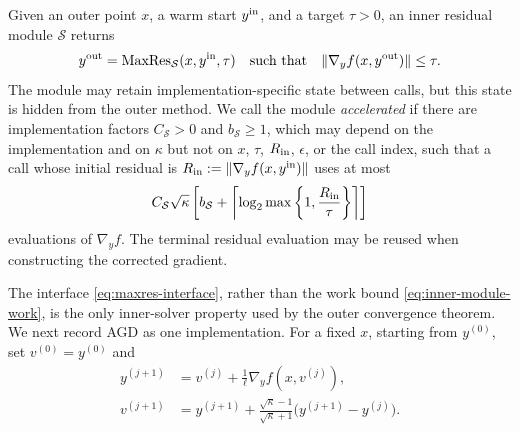 \documentclass{article}
\begin{document}
\begin{definition}
\label{def:inner-residual-module}
Given an outer point $x$, a warm start $y^{\rm in}$, and a target
$\tau>0$, an inner residual module $\mathcal S$ returns
\begin{equation}\label{eq:maxres-interface}
 y^{\rm out}
 =\operatorname{MaxRes}_{\mathcal S}(x,y^{\rm in},\tau)
 \quad\text{such that}\quad
 \|\nabla_yf(x,y^{\rm out})\|\le\tau.
\end{equation}
The module may retain implementation-specific state between calls, but
this state is hidden from the outer method.  We call the module
\emph{accelerated} if there are implementation factors
$C_{\mathcal S}>0$ and $b_{\mathcal S}\ge1$, which may depend on the
implementation and on $\kappa$ but not on $x$, $\tau$, $R_{\rm in}$,
$\epsilon$, or the call index, such that a call whose
initial residual is
$R_{\rm in}:=\|\nabla_yf(x,y^{\rm in})\|$ uses at most
\begin{equation}\label{eq:inner-module-work}
 C_{\mathcal S}\sqrt\kappa\left[
 b_{\mathcal S}
 +\left\lceil\log_2\max\left\{1,
       \frac{R_{\rm in}}{\tau}\right\}\right\rceil
 \right]
\end{equation}
evaluations of $\nabla_yf$.  The terminal residual evaluation may be
reused when constructing the corrected gradient.
\end{definition}

The interface \eqref{eq:maxres-interface}, rather than the work bound
\eqref{eq:inner-module-work}, is the only inner-solver property used by
the outer convergence theorem.  We next record AGD as one
implementation.  For a fixed $x$, starting from $y^{(0)}$, set
$v^{(0)}=y^{(0)}$ and
\begin{equation}\label{eq:agd-recursion}
\begin{aligned}
 y^{(j+1)}&=v^{(j)}+\frac1\ell\nabla_yf(x,v^{(j)}),\\
 v^{(j+1)}&=y^{(j+1)}
 +\frac{\sqrt\kappa-1}{\sqrt\kappa+1}
   \bigl(y^{(j+1)}-y^{(j)}\bigr).
\end{aligned}
\end{equation}
\end{document}
